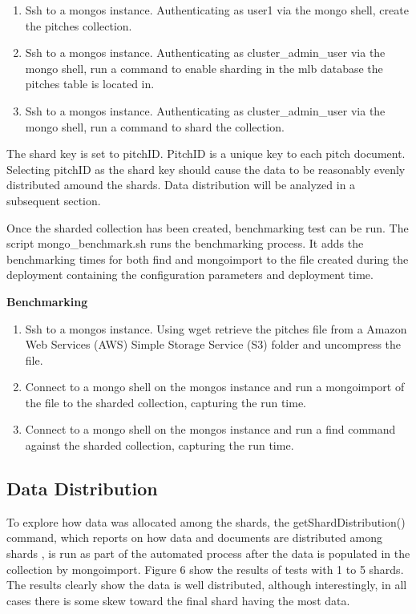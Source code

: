 \documentclass[9pt,twocolumn,twoside]{../../styles/osajnl}
\begin{document}
\vspace{-\topsep}
\begin{enumerate}
\item Ssh to a mongos instance.  Authenticating as user1 via the mongo shell, create the pitches collection.
\item Ssh to a mongos instance.  Authenticating as cluster\_admin\_user via the mongo shell, run a command to enable sharding in the mlb database the pitches table is located in.
\item Ssh to a mongos instance.  Authenticating as cluster\_admin\_user via the mongo shell, run a command to shard the collection.  
\end{enumerate}
\vspace{-\topsep}

The shard key is set to pitchID.  PitchID is a unique key to each pitch document.  Selecting pitchID as the shard key should cause the data to be reasonably evenly distributed amound the shards.  Data distribution will be analyzed in a subsequent section.

Once the sharded collection has been created, benchmarking test can be run.  The script mongo\_benchmark.sh runs the benchmarking process.  It adds the benchmarking times for both find and mongoimport to the file created during the deployment containing the configuration parameters and deployment time.

\textbf{Benchmarking}


\vspace{-\topsep}
\begin{enumerate}
\item Ssh to a mongos instance.  Using wget retrieve the pitches file from a Amazon Web Services (AWS) Simple Storage Service (S3) folder and uncompress the file.
\item Connect to a mongo shell on the mongos instance and run a mongoimport of the file to the sharded collection, capturing the run time.
\item Connect to a mongo shell on the mongos instance and run a find command against the sharded collection, capturing the run time. 
\end{enumerate}
\vspace{-\topsep}


\subsection{Data Distribution}

To explore how data was allocated among the shards, the getShardDistribution() command, which reports on how data and documents are distributed among shards \cite{www-shardDist}, is run as part of the automated process after the data is populated in the collection by mongoimport.  Figure 6 show the results of tests with 1 to 5 shards.  The results clearly show the data is well distributed, although interestingly, in all cases there is some skew toward the final shard having the most data.
\end{document}
